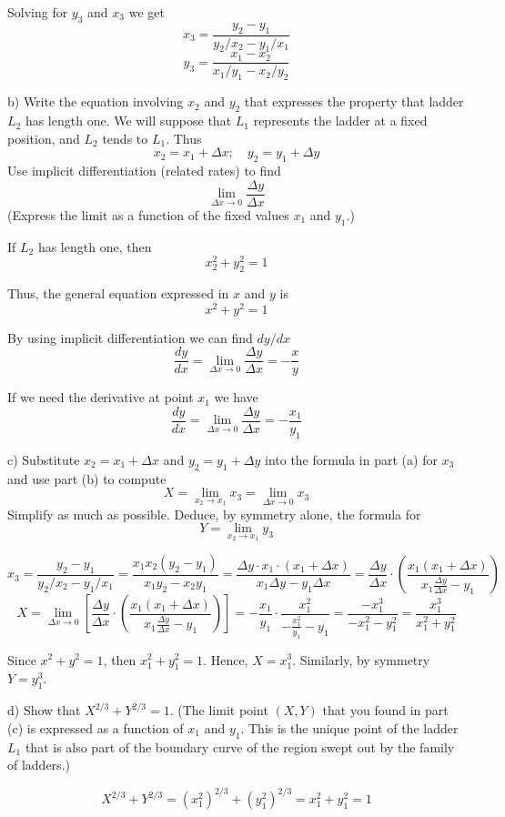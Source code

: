 \documentclass{article}
\begin{document}
Solving for $y_3$ and $x_3$ we get
\[ x_3 = \frac{y_2 - y_1}{y_2/x_2-y_1/x_1} \]
\[ y_3 = \frac{x_1 - x_2}{x_1/y_1 - x_2/y_2}\]

\begin{tcolorbox}
    b) Write the equation involving $x_2$ and $y_2$ that expresses the property that ladder $L_2$ has length one. We will suppose that $L_1$ represents the ladder at a fixed position, and $L_2$ tends to $L_1$. Thus
    \[ x_2 = x_1 + \Delta x; \quad y_2 = y_1 + \Delta y \]
    Use implicit differentiation (related rates) to find
    \[ \lim_{\Delta x \to 0} \frac{\Delta y}{\Delta x} \]
    (Express the limit as a function of the fixed values $x_1$ and $y_1$.)
\end{tcolorbox}
\par If $L_2$ has length one, then
\[ x_2^2 + y_2^2 = 1 \]
\par Thus, the general equation expressed in $x$ and $y$ is
\[ x^2 + y^2 = 1 \]
\par By using implicit differentiation we can find $dy/dx$
\[ \frac{dy}{dx} = \lim_{\Delta x \to 0} \frac{\Delta y}{\Delta x} = -\frac{x}{y} \]
\par If we need the derivative at point $x_1$ we have
\[ \frac{dy}{dx} = \lim_{\Delta x \to 0} \frac{\Delta y}{\Delta x}  = -\frac{x_1}{y_1}\]

\begin{tcolorbox}
    c) Substitute $x_2 = x_1 + \Delta x$ and $y_2 = y_1 + \Delta y$ into the formula in part (a) for $x_3$ and use part (b) to compute
    \[ X = \lim_{x_2 \to x_1} x_3 = \lim_{\Delta x \to 0} x_3  \]   Simplify as much as possible. Deduce, by symmetry alone, the formula for
    \[Y = \lim_{x_2 \to x_1} y_3\]
\end{tcolorbox}
\[ x_3 = \frac{y_2 - y_1}{y_2/x_2 - y_1/x_1} = \frac{x_1x_2(y_2-y_1)}{x_1y_2 - x_2y_1} = \frac{\Delta y \cdot x_1 \cdot (x_1 + \Delta x)}{x_1 \Delta y - y_1\Delta x} = \frac{\Delta y}{\Delta x} \cdot \left( \frac{x_1(x_1 + \Delta x)}{x_1\frac{\Delta y}{\Delta x} - y_1} \right) \]
\[ X = \lim_{\Delta x \to 0} \left[ \frac{\Delta y}{\Delta x} \cdot \left( \frac{x_1(x_1 + \Delta x)}{x_1\frac{\Delta y}{\Delta x} - y_1} \right) \right] = -\frac{x_1}{y_1} \cdot \frac{x_1^2}{-\frac{x_1^2}{y_1} - y_1} = \frac{-x_1^3}{-x_1^2 - y_1^2} = \frac{x_1^3}{x_1^2 + y_1^2} \]

Since $x^2 + y^2 = 1$, then $x_1^2 + y_1^2 = 1$. Hence, $X = x_1^3$. Similarly, by symmetry $Y = y_1^3$.

\begin{tcolorbox}
    d) Show that $X^{2/3}+Y^{2/3} = 1$. (The limit point $(X, Y)$ that you found in part (c) is expressed as a function of $x_1$ and $y_1$. This is the unique point of the ladder $L_1$ that is also part of the boundary curve of the region swept out by the family of ladders.)
\end{tcolorbox}
\[ X^{2/3}+Y^{2/3} = \left( x_1^2 \right)^{2/3} + \left( y_1^2 \right)^{2/3} = x_1^2 + y_1^2 = 1 \]
\end{document}

